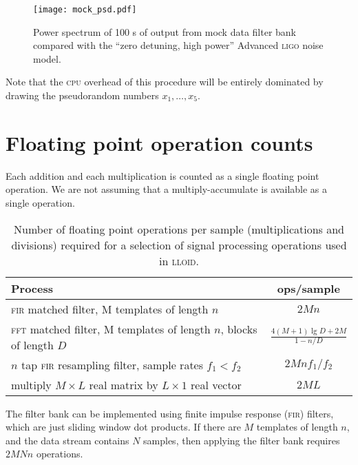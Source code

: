 \begin{figure}[h!]
\begin{center}
\texttt{[image: mock\_psd.pdf]}
\caption{Power spectrum of 100 s of output from mock data filter bank compared with the ``zero detuning, high power'' Advanced \textsc{ligo} noise model.}
\label{fig:mock-psd}
\end{center}
\end{figure}

Note that the \textsc{cpu} overhead of this procedure will be entirely dominated by drawing the pseudorandom numbers $x_1, \dots, x_5$.


\section{Floating point operation counts}

Each addition and each multiplication is counted as a single floating point operation.   We are not assuming that a multiply-accumulate is available as a single operation.

\begin{table}[htdp]
\caption{Number of floating point operations per sample (multiplications and divisions) required for a selection of signal processing operations used in \textsc{lloid}.}
\begin{center}
\setlength{\extrarowheight}{6pt}
\begin{tabular}{l c}
\hline
Process & ops/sample \\
\hline\hline
\textsc{fir} matched filter, M templates of length $n$ & $2 M n$ \\\hline
\textsc{fft} matched filter, M templates of length $n$, blocks of length $D$ & $\frac{4 (M + 1) \lg D + 2 M}{1 - n/D}$ \\\hline
$n$ tap \textsc{fir} resampling filter, sample rates $f_1 < f_2$ & $2 M n f_1 / f_2$ \\\hline
multiply $M \times L$ real matrix by $L\times1$ real vector & $2 M L$ \\\hline
\end{tabular}
\end{center}
\label{table:flops}
\end{table}%


The filter bank can be implemented using finite impulse response (\textsc{fir}) filters, which are just sliding window dot products.  If there are $M$ templates of length $n$, and the data stream contains $N$ samples, then applying the filter bank requires $2 M N n$ operations.

